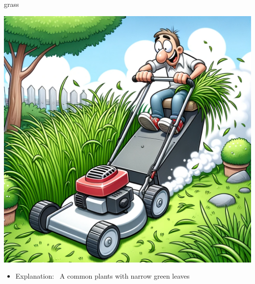 \documentclass[avery5371, grid,frame]{flashcards}
\begin{document}
\renewcommand{\cardpaper}{a4paper}
\renewcommand{\cardpapermode}{landscape}
\renewcommand{\cardrows}{2}
\renewcommand{\cardcolumns}{2}
\setlength{\cardheight}{3.5in}
\setlength{\cardwidth}{5.0in}
\setlength{\topoffset}{0.50in}
\setlength{\oddoffset}{0.50in}
\setlength{\evenoffset}{0.50in}

\begin{flashcard}{grass}
    \vspace*{\fill}
    \begin{center}
        \begin{minipage}[c]{.45\textwidth}
            \includegraphics[width=\textwidth]{cards/g/grass/grass - a lawnmower cutting tall grass, leaving behind a neat and trimmed lawn.png}
        \end{minipage}
        \begin{minipage}[c]{.45\textwidth}
            \begin{itemize}\setlength\itemsep{12pt}
            \item Explanation: \ A common plants with narrow green leaves


\end{itemize}
\end{minipage}
\end{center}
\end{flashcard}
\end{document}
